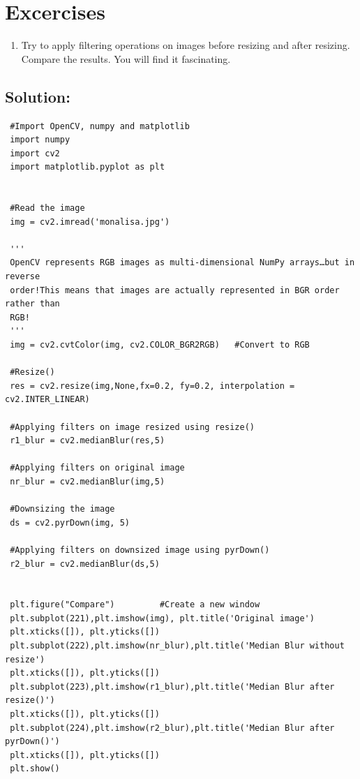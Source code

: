 \documentclass[]{article}
\providecommand{\tightlist}{%
  \setlength{\itemsep}{0pt}\setlength{\parskip}{0pt}}
\begin{document}
\section{Excercises}\label{excercises}

\begin{enumerate}
\def\labelenumi{\arabic{enumi}.}
\tightlist
\item
  Try to apply filtering operations on images before resizing and after
  resizing. Compare the results. You will find it fascinating.
\end{enumerate}

\subsection{Solution:}\label{solution}

\begin{verbatim}
 #Import OpenCV, numpy and matplotlib
 import numpy
 import cv2
 import matplotlib.pyplot as plt


 #Read the image
 img = cv2.imread('monalisa.jpg')

 '''
 OpenCV represents RGB images as multi-dimensional NumPy arrays…but in reverse
 order!This means that images are actually represented in BGR order rather than
 RGB!
 '''
 img = cv2.cvtColor(img, cv2.COLOR_BGR2RGB)   #Convert to RGB

 #Resize()
 res = cv2.resize(img,None,fx=0.2, fy=0.2, interpolation = cv2.INTER_LINEAR)
 
 #Applying filters on image resized using resize()
 r1_blur = cv2.medianBlur(res,5)

 #Applying filters on original image
 nr_blur = cv2.medianBlur(img,5)

 #Downsizing the image
 ds = cv2.pyrDown(img, 5)

 #Applying filters on downsized image using pyrDown()
 r2_blur = cv2.medianBlur(ds,5)


 plt.figure("Compare")         #Create a new window
 plt.subplot(221),plt.imshow(img), plt.title('Original image')
 plt.xticks([]), plt.yticks([])
 plt.subplot(222),plt.imshow(nr_blur),plt.title('Median Blur without resize')
 plt.xticks([]), plt.yticks([])
 plt.subplot(223),plt.imshow(r1_blur),plt.title('Median Blur after resize()')
 plt.xticks([]), plt.yticks([])
 plt.subplot(224),plt.imshow(r2_blur),plt.title('Median Blur after pyrDown()')
 plt.xticks([]), plt.yticks([])
 plt.show()
\end{verbatim}
\end{document}
